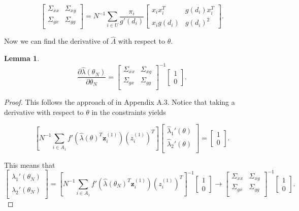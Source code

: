 \documentclass[12pt]{article}
\renewcommand{\bf}[1]{\mathbf{#1}}
\newtheorem{lemma}{Lemma}
\begin{document}
\[
\begin{bmatrix} 
  \Sigma_{xx} & \Sigma_{xg} \\
  \Sigma_{gx} & \Sigma_{gg} \\ 
\end{bmatrix} =
N^{-1} \sum_{i \in U} \frac{\pi_i}{g'(d_i)}
\begin{bmatrix}
  x_i x_i^T & g(d_i) x_i^T \\
  x_i g(d_i) & g(d_i)^2
\end{bmatrix}.
\]

Now we can find the derivative of $\hat \Lambda$ with respect to $\theta$.


\begin{lemma}
  \[\frac{\partial \hat \lambda(\theta_N)}{\partial \theta_N} = 
\begin{bmatrix} 
  \Sigma_{xx} & \Sigma_{xg} \\
  \Sigma_{gx} & \Sigma_{gg} \\ 
\end{bmatrix}^{-1}
\begin{bmatrix} 1 \\ 0 \end{bmatrix}.\]

\end{lemma}

\begin{proof}
This follows the approach of \cite{kwon2024debiased} in Appendix A.3.
Notice that taking a derivative with respect to $\theta$ in the
constraints yields

\[
\left[N^{-1} \sum_{i \in A_1}f'(\hat \lambda(\theta)^T\bf z_i^{(1)}) 
(z_i^{(1)})^T\right]
\begin{bmatrix}
  \hat \lambda_1'(\theta) \\
  \hat \lambda_2'(\theta) \\
\end{bmatrix} =
\begin{bmatrix} 1 \\ 0 \end{bmatrix}.
\]

This means that 
\[
\begin{bmatrix}
  \hat \lambda_1'(\theta_N) \\
  \hat \lambda_2'(\theta_N) \\
\end{bmatrix} =
\left[N^{-1} \sum_{i \in A_1}f'(\hat \lambda(\theta_N)^T\bf z_i^{(1)}) 
(z_i^{(1)})^T\right]^{-1}
\begin{bmatrix} 1 \\ 0 \end{bmatrix} \to
\begin{bmatrix} 
  \Sigma_{xx} & \Sigma_{xg} \\
  \Sigma_{gx} & \Sigma_{gg} \\ 
\end{bmatrix}^{-1}
\begin{bmatrix} 1 \\ 0 \end{bmatrix}.
\]

\end{proof}
\end{document}

